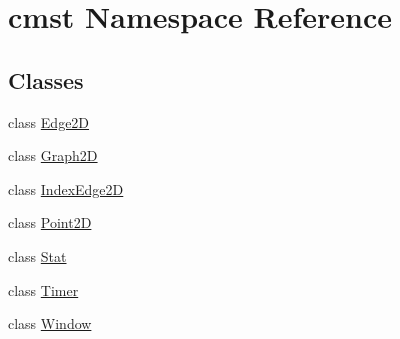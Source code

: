 \hypertarget{namespacecmst}{}\section{cmst Namespace Reference}
\label{namespacecmst}
\subsection*{Classes}
\begin{DoxyCompactItemize}
\item 
class \hyperlink{classcmst_1_1_edge2_d}{Edge2D}
\item 
class \hyperlink{classcmst_1_1_graph2_d}{Graph2D}
\item 
class \hyperlink{classcmst_1_1_index_edge2_d}{Index\+Edge2D}
\item 
class \hyperlink{classcmst_1_1_point2_d}{Point2D}
\item 
class \hyperlink{classcmst_1_1_stat}{Stat}
\item 
class \hyperlink{classcmst_1_1_timer}{Timer}
\item 
class \hyperlink{classcmst_1_1_window}{Window}
\end{DoxyCompactItemize}
